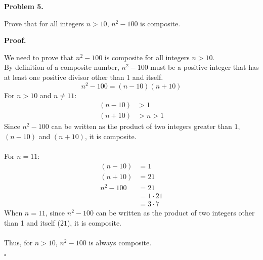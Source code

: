 \documentclass{article}
\newenvironment{problem}[1]{
    \begin{mdframed}[backgroundcolor=gray!20, skipabove=\baselineskip, skipbelow=\baselineskip, nobreak=true, innerleftmargin=10pt, innerrightmargin=10pt, innertopmargin=10pt, innerbottommargin=10pt]
    \textbf{Problem #1.}
}{
    \end{mdframed}
}
\newenvironment{proof}{
    \begin{mdframed}[nobreak=true, innerleftmargin=10pt, innerrightmargin=10pt, innertopmargin=10pt, innerbottommargin=10pt]
    \textbf{Proof.}
}{
    \hfill $\square$
    \end{mdframed}
}
\begin{document}
\begin{problem}{5}
    Prove that for all integers $n > 10$, $n^2 - 100$ is composite.
\end{problem}
\begin{proof}
    We need to prove that $n^2 - 100$ is composite for all integers $n > 10$. \\
    By definition of a composite number, $n^2 - 100$ must be a positive integer that has at least one positive divisor other than 1 and itself.
    \begin{equation*}
        n^2 - 100 = (n - 10)(n + 10)
    \end{equation*}
    For $n > 10$ and $n \neq 11$:
    \begin{align*}
        (n-10) &> 1 \\
        (n+10) &> n > 1
    \end{align*}
    Since $n^2-100$ can be written as the product of two integers greater than $1$, $(n-10)$ and $(n+10)$, it is composite. \\ \\
    For $n = 11$:
    \begin{align*}
        (n-10) &= 1 \\
        (n+10) &= 21 \\
        n^2 - 100 &= 21 \\
        &= 1 \cdot 21 \\
        &= 3 \cdot 7
    \end{align*}
    When $n = 11$, since $n^2 - 100$ can be written as the product of two integers other than 1 and itself ($21$), it is composite. \\ \\
    Thus, for $n > 10$, $n^2 - 100$ is always composite.
\end{proof}
\end{document}
